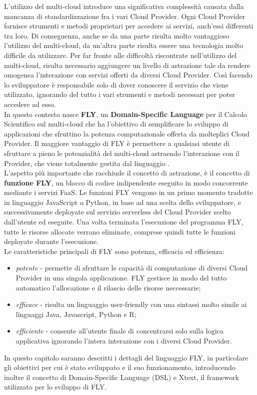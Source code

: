 L'utilizzo del multi-cloud introduce una significativa complessità causata dalla mancanza di standardizzazione fra i vari Cloud Provider. Ogni Cloud Provider fornisce strumenti e metodi proprietari per accedere ai servizi, anch'essi differenti tra loro. Di conseguenza, anche se da una parte risulta molto vantaggioso l'utilizzo del multi-cloud, da un'altra parte risulta essere una tecnologia molto difficile da utilizzare. Per far fronte alle difficoltà riscontrate nell'utilizzo del multi-cloud, risulta necessario aggiungere un livello di astrazione tale da rendere omogenea l'interazione con servizi offerti da diversi Cloud Provider. Così facendo lo sviluppatore è responsabile solo di dover conoscere il servizio che viene utilizzato, ignorando del tutto i vari strumenti e metodi necessari per poter accedere ad esso. \\
In questo contesto nasce \textbf{FLY}, un \textbf{Domain-Specific Language} per il Calcolo Scientifico sul multi-cloud che ha l’obiettivo di semplificare lo sviluppo di applicazioni che sfruttino la potenza computazionale offerta da molteplici Cloud Provider. Il maggiore vantaggio di FLY è permettere a qualsiasi utente di sfruttare a pieno le potenzialità del multi-cloud astraendo l'interazione con il Provider, che viene totalmente gestita dal linguaggio \cite{isislab}. \\
L’aspetto più importante che racchiude il concetto di astrazione, è il concetto di \textbf{funzione FLY}, un blocco di codice indipendente eseguito in modo concorrente mediante i servizi FaaS. Le funzioni FLY vengono in un primo momento tradotte in linguaggio JavaScript o Python, in base ad una scelta dello sviluppatore, e successivamente deployate sul servizio serverless del Cloud Provider scelto dall'utente ed eseguite. Una volta terminata l'esecuzione del programma FLY, tutte le risorse allocate verrano eliminate, comprese quindi tutte le funzioni deployate durante l'esecuzione. \\
Le caratteristiche principali di FLY sono potenza, efficacia ed efficienza:
\begin{itemize}
    \item \textit{potente} - permette di sfruttare le capacità di computazione di diversi Cloud Provider in una singola applicazione. FLY gestisce in modo del tutto automatico l'allocazione e il rilascio delle risorse neccessarie;
    \item \textit{efficace} - risulta un linguaggio user-friendly con una sintassi molto simile ai linguaggi Java, Javascript, Python e R;    
    \item \textit{efficiente} - consente all'utente finale di concentrarsi solo sulla logica applicativa ignorando l'intera interazione con i diversi Cloud Provider.
\end{itemize}
In questo capitolo saranno descritti i dettagli del linguaggio FLY, in particolare gli obiettivi per cui è stato sviluppato e il suo funzionamento, introducendo inoltre il concetto di Domain-Specific Language (DSL) e Xtext, il framework utilizzato per lo sviluppo di FLY.

